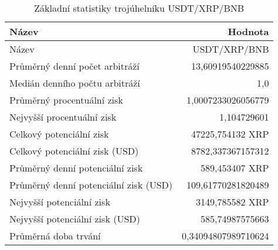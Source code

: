 \begin{table}\centering
\caption{Základní statistiky trojúhelníku USDT/XRP/BNB}
\label{USDTXRPBNB_stats}
\begin{tabular}{|| l | r ||}
\hline Název & Hodnota \\ 
\hline\hline Název & USDT/XRP/BNB \\ 
\hline Průměrný denní počet arbitráží & 13,60919540229885 \\ 
\hline Medián denního počtu arbitráží & 1,0 \\ 
\hline Průměrný procentuální zisk & 1,0007233026056779 \\ 
\hline Nejvyšší procentuální zisk & 1,104729601 \\ 
\hline Celkový potenciální zisk & 47225,754132 XRP \\ 
\hline Celkový potenciální zisk (USD) & 8782,337367157312 \\ 
\hline Průměrný denní potenciální zisk & 589,453407 XRP \\ 
\hline Průměrný denní potenciální zisk (USD) & 109,61770281820489 \\ 
\hline Nejvyšší potenciální zisk & 3149,785582 XRP \\ 
\hline Nejvyšší potenciální zisk (USD) & 585,74987575663 \\ 
\hline Průměrná doba trvání & 0,34094807989710624 \\ 
\hline
\end{tabular}
\end{table}